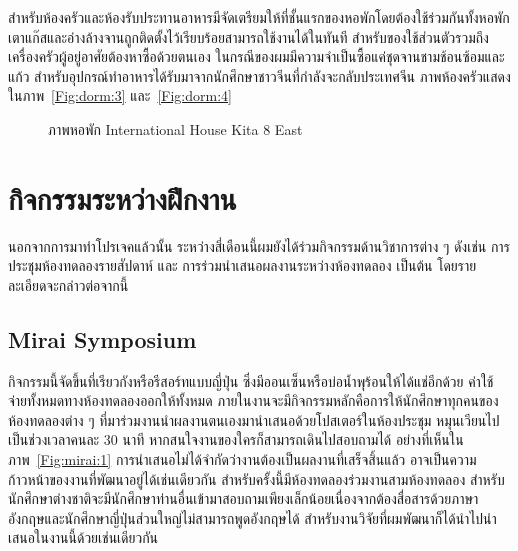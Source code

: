 สำหรับห้องครัวและห้องรับประทานอาหารมีจัดเตรียมให้ที่ชั้นแรกของหอพักโดยต้องใช้ร่วมกันทั้งหอพัก เตาแก๊สและอ่างล้างจานถูกติดตั้งไว้เรียบร้อยสามารถใช้งานได้ในทันที สำหรับของใช้ส่วนตัวรวมถึงเครื่องครัวผู้อยู่อาศัยต้องหาซื้อด้วยตนเอง ในกรณีของผมมีความจำเป็นซื้อแค่ชุดจานชามช้อนซ้อมและแก้ว สำหรับอุปกรณ์ทำอาหารได้รับมาจากนักศึกษาชาวจีนที่กำลังจะกลับประเทศจีน ภาพห้องครัวแสดงในภาพ~\ref{Fig:dorm:3} และ~\ref{Fig:dorm:4}

\begin{figure}[!h]
    \centering
    \caption{ภาพหอพัก International House Kita 8 East}
    \label{Fig:dorm}
\end{figure}

\chapter{กิจกรรมระหว่างฝึกงาน}

นอกจากการมาทำโปรเจคแล้วนั้น ระหว่างสี่เดือนนี้ผมยังได้ร่วมกิจกรรมด้านวิชาการต่าง ๆ ดังเช่น การประชุมห้องทดลองรายสัปดาห์ และ การร่วมนำเสนอผลงานระหว่างห้องทดลอง เป็นต้น โดยรายละเอียดจะกล่าวต่อจากนี้

\section{Mirai Symposium}

กิจกรรมนี้จัดขึ้นที่เรียวกังหรือรีสอร์ทแบบญี่ปุ่น ซึ่งมีออนเซ็นหรือบ่อน้ำพุร้อนให้ได้แช่อีกด้วย ค่าใช้จ่ายทั้งหมดทางห้องทดลองออกให้ทั้งหมด ภายในงานจะมีกิจกรรมหลักคือการให้นักศึกษาทุกคนของห้องทดลองต่าง ๆ ที่มาร่วมงานนำผลงานตนเองมานำเสนอด้วยโปสเตอร์ในห้องประชุม หมุนเวียนไปเป็นช่วงเวลาคนละ 30 นาที หากสนใจงานของใครก็สามารถเดินไปสอบถามได้ อย่างที่เห็นในภาพ~\ref{Fig:mirai:1} การนำเสนอไม่ได้จำกัดว่างานต้องเป็นผลงานที่เสร็จสิ้นแล้ว อาจเป็นความก้าวหน้าของงานที่พัฒนาอยู่ได้เช่นเดียวกัน สำหรับครั้งนี้มีห้องทดลองร่วมงานสามห้องทดลอง สำหรับนักศึกษาต่างชาติจะมีนักศึกษาท่านอื่นเข้ามาสอบถามเพียงเล็กน้อยเนื่องจากต้องสื่อสารด้วยภาษาอังกฤษและนักศึกษาญี่ปุ่นส่วนใหญ่ไม่สามารถพูดอังกฤษได้ สำหรับงานวิจัยที่ผมพัฒนาก็ได้นำไปนำเสนอในงานนี้ด้วยเช่นเดียวกัน

